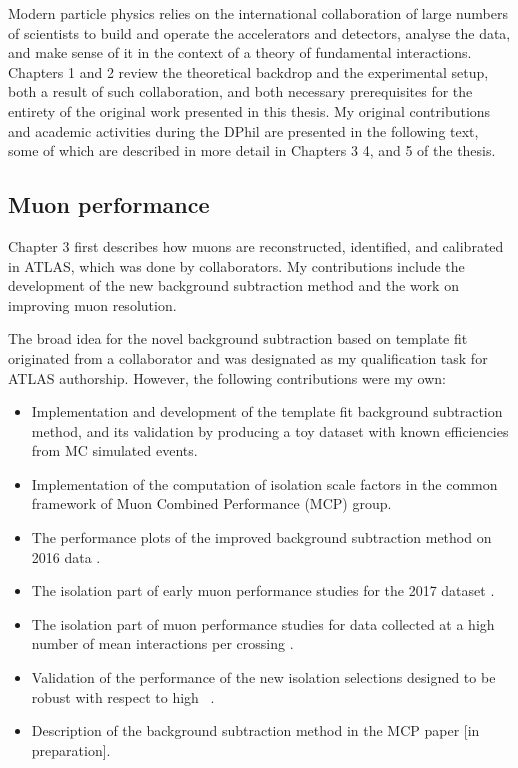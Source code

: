 \begin{originality}

Modern particle physics relies on the international collaboration
of large numbers of scientists to build and operate the accelerators and
detectors, analyse the data, and make sense of it in the
context of a theory of fundamental interactions. Chapters 1
and 2 review the theoretical backdrop and the experimental
setup, both a result of such collaboration, and both necessary
prerequisites for the entirety of the original work presented
in this thesis. My original contributions and academic
activities during the DPhil are presented in the following
text, some of which are described in more detail in Chapters 3
4, and 5 of the thesis.

\subsection*{Muon performance}

Chapter 3 first describes how muons are reconstructed,
identified, and calibrated in ATLAS, which was done by
collaborators. My contributions include the development
of the new background subtraction method and the work on
improving muon resolution.

The broad idea for the novel background subtraction
based on template fit originated from a collaborator and 
was designated as my qualification task for ATLAS authorship.
However, the following contributions were my own:
\begin{itemize}
\item Implementation and development of the template fit background
subtraction method, and its validation by producing a toy
dataset with known efficiencies from MC simulated events.
\item Implementation of the computation of isolation scale factors in
the common framework of Muon Combined Performance (MCP) group.
\item The performance plots of the improved background
subtraction method on 2016 data \cite{Zgubic:2293041}.
\item The isolation part of early muon performance
studies for the 2017 dataset \cite{Bellomo:2282672}.
\item The isolation part of muon performance
studies for data collected at a high number of mean interactions
per crossing \cite{Kohler:2293040}.
\item Validation of the performance of the new isolation
selections designed to be robust with respect to high
\pileup~\cite{Zgubic:2320874}.
\item Description of the background subtraction method in
the MCP paper [in preparation].
\end{itemize}


\end{originality}
